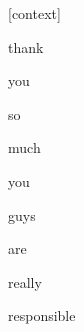 \documentclass[varwidth]{standalone}
\begin{document}
\begin{CJK*}{UTF8}{gbsn}
{\setlength{\fboxsep}{0pt}\colorbox{white!0}{\parbox{0.9\textwidth}{
\colorbox{red!0.00039272100548259914}{\strut [context]} \colorbox{red!0.7239255309104919}{\strut thank} \colorbox{red!0.021517612040042877}{\strut you} \colorbox{red!0.0023972729686647654}{\strut so} \colorbox{red!0.05732237547636032}{\strut much} \colorbox{red!0.006452600006014109}{\strut you} \colorbox{red!0.10170673578977585}{\strut guys} \colorbox{red!0.2967233657836914}{\strut are} \colorbox{red!1.0397922992706299}{\strut really} \colorbox{red!97.74976348876953}{\strut responsible} 
}}}
\end{CJK*}
\end{document}
